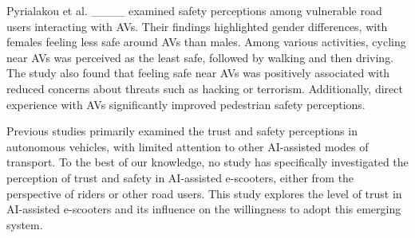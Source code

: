 
Pyrialakou et al. ____ examined safety perceptions among vulnerable road users interacting with AVs. Their findings highlighted gender differences, with females feeling less safe around AVs than males. Among various activities, cycling near AVs was perceived as the least safe, followed by walking and then driving. The study also found that feeling safe near AVs was positively associated with reduced concerns about threats such as hacking or terrorism. Additionally, direct experience with AVs significantly improved pedestrian safety perceptions.

Previous studies primarily examined the trust and safety perceptions in autonomous vehicles, with limited attention to other AI-assisted modes of transport. To the best of our knowledge, no study has specifically investigated the perception of trust and safety in AI-assisted e-scooters, either from the perspective of riders or other road users. This study explores the level of trust in AI-assisted e-scooters and its influence on the willingness to adopt this emerging system.


